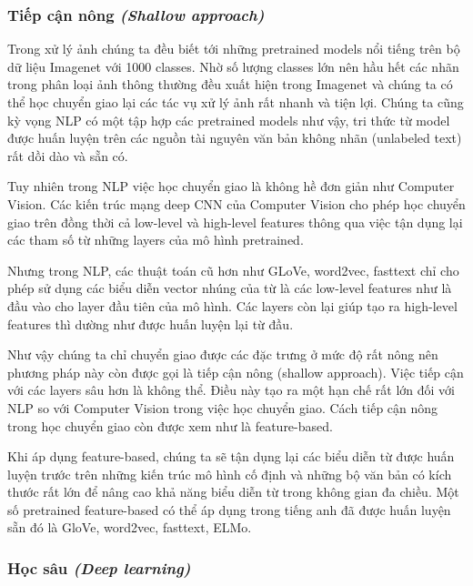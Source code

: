 \subsubsection{Tiếp cận nông \textit{(Shallow approach)}}
Trong xử lý ảnh chúng ta đều biết tới những pretrained models nổi tiếng trên bộ dữ liệu Imagenet với 1000 classes. Nhờ số lượng classes lớn nên hầu hết các nhãn trong phân loại ảnh thông thường đều xuất hiện trong Imagenet và chúng ta có thể học chuyển giao lại các tác vụ xử lý ảnh rất nhanh và tiện lợi. Chúng ta cũng kỳ vọng NLP có một tập hợp các pretrained models như vậy, tri thức từ model được huấn luyện trên các nguồn tài nguyên văn bản không nhãn (unlabeled text) rất dồi dào và sẵn có\cite{webpage20}.

Tuy nhiên trong NLP việc học chuyển giao là không hề đơn giản như Computer Vision. Các kiến trúc mạng deep CNN của Computer Vision cho phép học chuyển giao trên đồng thời cả low-level và high-level features thông qua việc tận dụng lại các tham số từ những layers của mô hình pretrained.

Nhưng trong NLP, các thuật toán cũ hơn như GLoVe, word2vec, fasttext chỉ cho phép sử dụng các biểu diễn vector nhúng của từ là các low-level features như là đầu vào cho layer đầu tiên của mô hình. Các layers còn lại giúp tạo ra high-level features thì dường như được huấn luyện lại từ đầu.

Như vậy chúng ta chỉ chuyển giao được các đặc trưng ở mức độ rất nông nên phương pháp này còn được gọi là tiếp cận nông (shallow approach). Việc tiếp cận với các layers sâu hơn là không thể. Điều này tạo ra một hạn chế rất lớn đối với NLP so với Computer Vision trong việc học chuyển giao. Cách tiếp cận nông trong học chuyển giao còn được xem như là feature-based.

Khi áp dụng feature-based, chúng ta sẽ tận dụng lại các biểu diễn từ được huấn luyện trước trên những kiến trúc mô hình cố định và những bộ văn bản có kích thước rất lớn để nâng cao khả năng biểu diễn từ trong không gian đa chiều. Một số pretrained feature-based có thể áp dụng trong tiếng anh đã được huấn luyện sẵn đó là GloVe, word2vec, fasttext, ELMo.

\subsubsection{Học sâu \textit{(Deep learning)}}

